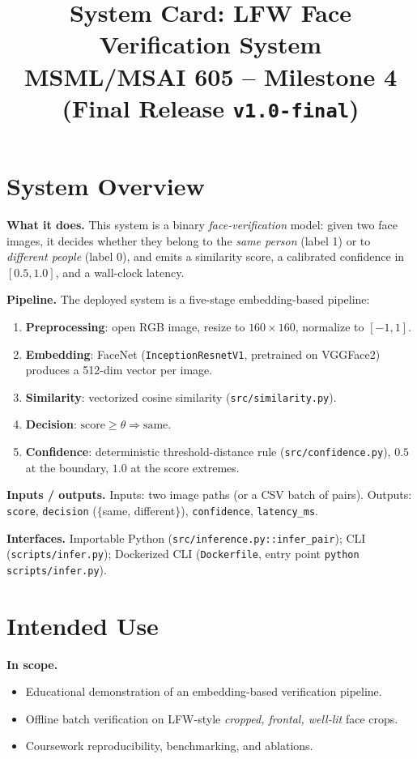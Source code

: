 \documentclass[11pt]{article}
\title{\textbf{System Card: LFW Face Verification System}\\
\large MSML/MSAI 605 -- Milestone 4 (Final Release \texttt{v1.0-final})}
\author{}
\date{}
\begin{document}
\maketitle
\vspace{-2em}

\section{System Overview}
\textbf{What it does.} This system is a binary \emph{face-verification} model: given two
face images, it decides whether they belong to the \emph{same person} (label 1) or to
\emph{different people} (label 0), and emits a similarity score, a calibrated confidence
in $[0.5, 1.0]$, and a wall-clock latency.

\textbf{Pipeline.} The deployed system is a five-stage embedding-based pipeline:
\begin{enumerate}[noitemsep, leftmargin=*]
    \item \textbf{Preprocessing}: open RGB image, resize to $160\times 160$, normalize to $[-1, 1]$.
    \item \textbf{Embedding}: FaceNet (\texttt{InceptionResnetV1}, pretrained on VGGFace2) produces a 512-dim vector per image.
    \item \textbf{Similarity}: vectorized cosine similarity (\texttt{src/similarity.py}).
    \item \textbf{Decision}: $\text{score} \geq \theta \Rightarrow \text{same}$.
    \item \textbf{Confidence}: deterministic threshold-distance rule (\texttt{src/confidence.py}), $0.5$ at the boundary, $1.0$ at the score extremes.
\end{enumerate}

\textbf{Inputs / outputs.} Inputs: two image paths (or a CSV batch of pairs). Outputs:
\texttt{score}, \texttt{decision} ($\{$same, different$\}$), \texttt{confidence}, \texttt{latency\_ms}.

\textbf{Interfaces.} Importable Python (\texttt{src/inference.py::infer\_pair}); CLI
(\texttt{scripts/infer.py}); Dockerized CLI (\texttt{Dockerfile}, entry point
\texttt{python scripts/infer.py}).

\section{Intended Use}
\textbf{In scope.}
\begin{itemize}[noitemsep, leftmargin=*]
    \item Educational demonstration of an embedding-based verification pipeline.
    \item Offline batch verification on LFW-style \emph{cropped, frontal, well-lit} face crops.
    \item Coursework reproducibility, benchmarking, and ablations.
\end{itemize}
\end{document}

